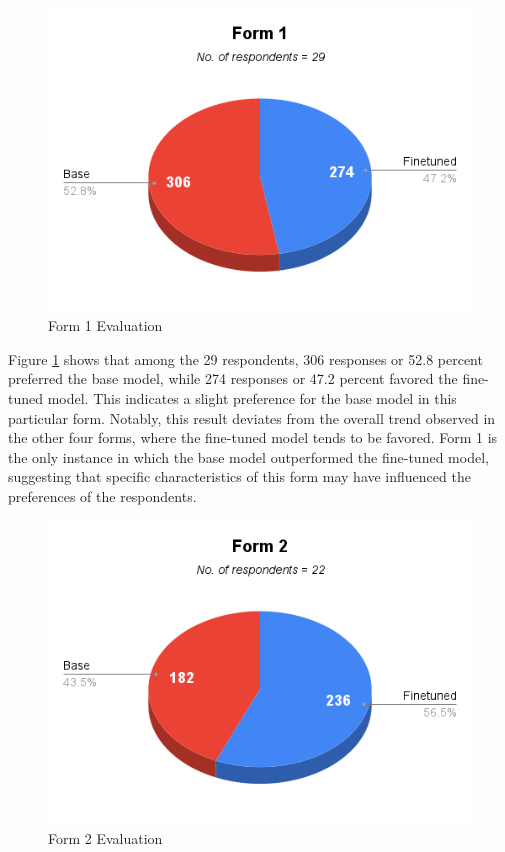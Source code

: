 \begin{figure}[htbp]
	\centering
	\includegraphics[scale=0.7]{figures/Form1.png}
	\caption{Form 1 Evaluation}
	\label{fig:form1}
\end{figure}

Figure \ref{fig:form1} shows that among the 29 respondents, 306 responses or 52.8 percent preferred the base model, while 274 responses or 47.2 percent favored the fine-tuned model. This indicates a slight preference for the base model in this particular form. Notably, this result deviates from the overall trend observed in the other four forms, where the fine-tuned model tends to be favored. Form 1 is the only instance in which the base model outperformed the fine-tuned model, suggesting that specific characteristics of this form may have influenced the preferences of the respondents. 


\begin{figure}[htbp]
	\centering
	\includegraphics[scale=0.7]{figures/Form2.png}
	\caption{Form 2 Evaluation}
	\label{fig:form2}
\end{figure}


